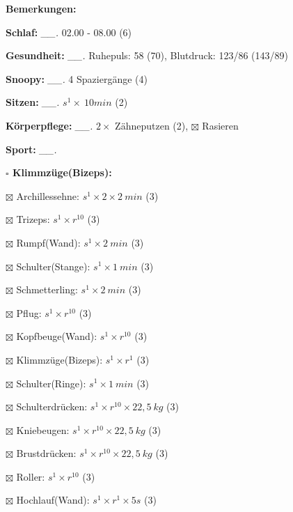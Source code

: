 \documentclass[10pt,a4paper]{article}
\newcommand\prop[1] {{\color {alizarin} {\bf #1}}}             %
\newcommand\mand[1] {{\color {burntorange} {\bf #1}}}          %
\newcommand\topspace{\vskip -15pt \hskip 20pt}
\newcommand\n[1] { {\sl #1.} \hskip 5pt }
\begin{document}
\begin{mdframed}[style=daystyle]
  \begin{labeling}{{\mand {Bemerkungen:}}}
    \setlength\itemsep{-3pt}
  \item[{\mand {Schlaf:}}]        \n{\_\_} 02.00 - 08.00 (6)
  \item[{\mand {Gesundheit:}}]    \n{\_\_} Ruhepuls: 58 (70), Blutdruck: 123/86 (143/89)
  \item[{\mand {Snoopy:}}]        \n{\_\_} 4 Spaziergänge (4)
  \item[{\mand {Sitzen:}}]        \n{\_\_} $s^1 \times\ 10 min$ (2)
  \item[{\mand {Körperpflege:}}]  \n{\_\_} $2 \times$ Zähneputzen (2), $\boxtimes$ Rasieren
  \item[{\mand {Sport:}}]         \n{\_\_}
    \topspace
    \begin{minipage}{0.75\textwidth}  
      \begin{labeling}{\prop {$\square$ {Klimmzüge(Bizeps):}}} 
        \setlength\itemsep{-3pt}
      \item[$\boxtimes$ Archillessehne:]    $s^1 \times 2 \times 2\ min$ (3)
      \item[$\boxtimes$ Trizeps:]           $s^1 \times r^{10}$ (3)
      \item[$\boxtimes$ Rumpf(Wand):]       $s^1 \times 2\ min$ (3)
      \item[$\boxtimes$ Schulter(Stange):]  $s^1 \times 1\ min$ (3)
      \item[$\boxtimes$ Schmetterling:]     $s^1 \times 2\ min$ (3)
      \item[$\boxtimes$ Pflug:]             $s^1 \times r^{10}$ (3)
      \item[$\boxtimes$ Kopfbeuge(Wand):]   $s^1 \times r^{10}$ (3)
      \item[$\boxtimes$ Klimmzüge(Bizeps):] $s^1 \times r^1$ (3)
      \item[$\boxtimes$ Schulter(Ringe):]   $s^1 \times 1\ min$ (3)
      \item[$\boxtimes$ Schulterdrücken:]   $s^1 \times r^{10} \times 22,5\ kg$ (3)
      \item[$\boxtimes$ Kniebeugen:]        $s^1 \times r^{10} \times 22,5\ kg$ (3)
      \item[$\boxtimes$ Brustdrücken:]      $s^1 \times r^{10} \times 22,5\ kg$ (3)
      \item[$\boxtimes$ Roller:]            $s^1 \times r^{10}$ (3)
      \item[$\boxtimes$ Hochlauf(Wand):]    $s^1 \times r^{1} \times 5s$ (3)

\end{labeling}
\end{minipage}
\end{labeling}
\end{mdframed}
\end{document}
